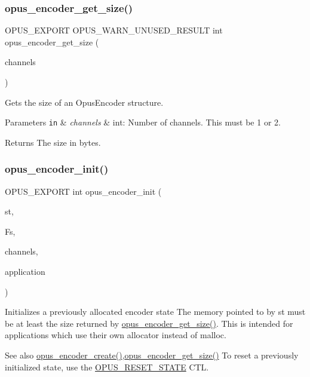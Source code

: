 \subsubsection{\texorpdfstring{opus\+\_\+encoder\+\_\+get\+\_\+size()}{opus\_encoder\_get\_size()}}
{\footnotesize\ttfamily O\+P\+U\+S\+\_\+\+E\+X\+P\+O\+RT O\+P\+U\+S\+\_\+\+W\+A\+R\+N\+\_\+\+U\+N\+U\+S\+E\+D\+\_\+\+R\+E\+S\+U\+LT int opus\+\_\+encoder\+\_\+get\+\_\+size (\begin{DoxyParamCaption}\item[{int}]{channels }\end{DoxyParamCaption})}

Gets the size of an {\ttfamily Opus\+Encoder} structure. 
\begin{DoxyParams}[1]{Parameters}
\mbox{\tt in}  & {\em channels} & {\ttfamily int}\+: Number of channels. This must be 1 or 2. \\
\hline
\end{DoxyParams}
\begin{DoxyReturn}{Returns}
The size in bytes. 
\end{DoxyReturn}
\mbox{\label{group__opus__encoder_ga363e90db0f434b2d8fde7dcf989270b1}} 
\subsubsection{\texorpdfstring{opus\+\_\+encoder\+\_\+init()}{opus\_encoder\_init()}}
{\footnotesize\ttfamily O\+P\+U\+S\+\_\+\+E\+X\+P\+O\+RT int opus\+\_\+encoder\+\_\+init (\begin{DoxyParamCaption}\item[{\hyperlink{group__opus__encoder_gaf461a3ef2f10c2fe8b994a176f06c9bd}{Opus\+Encoder} $\ast$}]{st,  }\item[{\hyperlink{opus__types_8h_aa4d309d6f80b99dbabebc8f98879ab9a}{opus\+\_\+int32}}]{Fs,  }\item[{int}]{channels,  }\item[{int}]{application }\end{DoxyParamCaption})}

Initializes a previously allocated encoder state The memory pointed to by st must be at least the size returned by \hyperlink{group__opus__encoder_ga9ac72d062eca0c77711f5b04b9dcc645}{opus\+\_\+encoder\+\_\+get\+\_\+size()}. This is intended for applications which use their own allocator instead of malloc. \begin{DoxySeeAlso}{See also}
\hyperlink{group__opus__encoder_ga8a145618886fed2d6fbc79a4071a939d}{opus\+\_\+encoder\+\_\+create()},\hyperlink{group__opus__encoder_ga9ac72d062eca0c77711f5b04b9dcc645}{opus\+\_\+encoder\+\_\+get\+\_\+size()} To reset a previously initialized state, use the \hyperlink{group__opus__genericctls_gadc74e4fa8bcdf9994187d52d92207337}{O\+P\+U\+S\+\_\+\+R\+E\+S\+E\+T\+\_\+\+S\+T\+A\+TE} C\+TL. 
\end{DoxySeeAlso}

